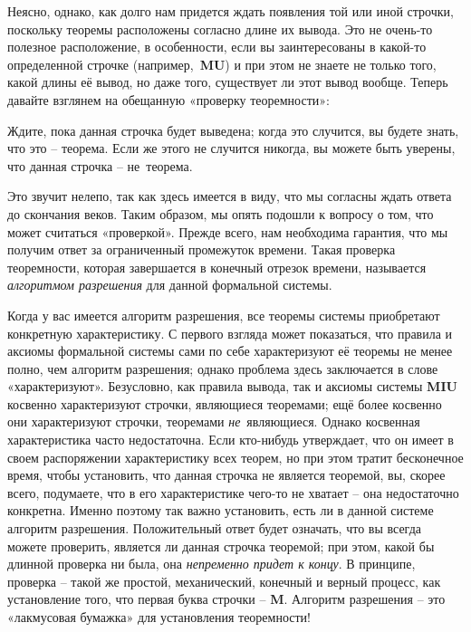 \documentclass[../main.tex]{subfiles}
\begin{document}

Неясно, однако, как долго нам придется ждать появления той или иной строчки, поскольку теоремы расположены согласно длине их вывода. Это не очень-то полезное расположение, в особенности, если вы заинтересованы в какой-то определенной строчке (например,~\textbf{MU}) и при этом не знаете не только того, какой длины её вывод, но даже того, существует ли этот вывод вообще. Теперь давайте взглянем на обещанную «проверку теоремности»:

Ждите, пока данная строчка будет выведена; когда это случится, вы будете знать, что это \--- теорема. Если же этого не случится никогда, вы можете быть уверены, что данная строчка \--- не~теорема.

Это звучит нелепо, так как здесь имеется в виду, что мы согласны ждать ответа до скончания веков. Таким образом, мы опять подошли к вопросу о том, что может считаться «проверкой». Прежде всего, нам необходима гарантия, что мы получим ответ за ограниченный промежуток времени. Такая проверка теоремности, которая завершается в конечный отрезок времени, называется \emph{алгоритмом разрешения} для данной формальной системы.

Когда у вас имеется алгоритм разрешения, все теоремы системы приобретают конкретную характеристику. С первого взгляда может показаться, что правила и аксиомы формальной системы сами по себе характеризуют её теоремы не менее полно, чем алгоритм разрешения; однако проблема здесь заключается в слове «характеризуют». Безусловно, как правила вывода, так и аксиомы системы \textbf{MIU} косвенно характеризуют строчки, являющиеся теоремами; ещё более косвенно они характеризуют строчки, теоремами \emph{не}~являющиеся. Однако косвенная характеристика часто недостаточна. Если кто-нибудь утверждает, что он имеет в своем распоряжении характеристику всех теорем, но при этом тратит бесконечное время, чтобы установить, что данная строчка не является теоремой, вы, скорее всего, подумаете, что в его характеристике чего-то не хватает \--- она недостаточно конкретна. Именно поэтому так важно установить, есть ли в данной системе алгоритм разрешения. Положительный ответ будет означать, что вы всегда можете проверить, является ли данная строчка теоремой; при этом, какой бы длинной проверка ни была, она \emph{непременно придет к концу}. В принципе, проверка \--- такой же простой, механический, конечный и верный процесс, как установление того, что первая буква строчки \--- \textbf{M}\@. Алгоритм разрешения \--- это «лакмусовая бумажка» для установления теоремности!
\end{document}
